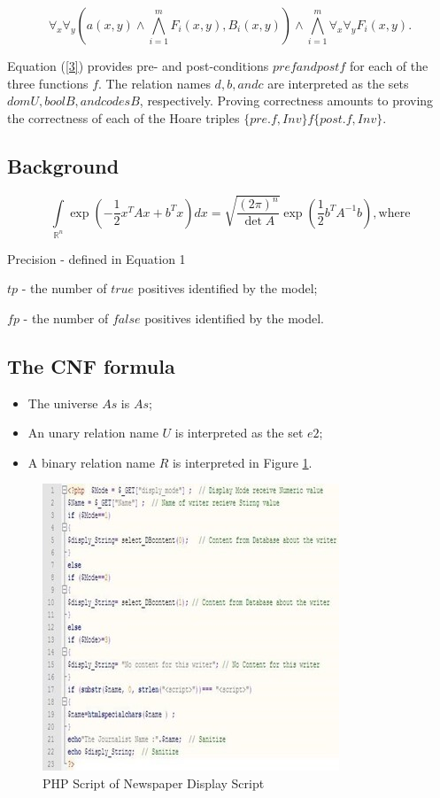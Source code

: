 \documentclass[12pt]{acmart}
\begin{document}
\begin{equation}
    \forall_x \forall_y (a(x,y) \wedge \bigwedge_{i=1}^mF_i(x,y), B_i(x,y)) \wedge \bigwedge_{i=1}^m \forall_x \forall_y F_i(x,y).
    \label{2}
\end{equation}
 
 Equation (\ref{3}) provides pre- and post-conditions $pref and postf$ for each of the three functions $f$. The relation names $d, b, and c$ are interpreted as the sets $domU   , boolB, and codesB$, respectively. Proving correctness amounts to proving the correctness of each of the Hoare triples $\{pre.f, Inv\}  f  \{post.f, Inv\}$.

\subsection{Background}

\begin{equation}
    \int\limits_{\mathbb{R}^n} \exp\left( -\frac{1}{2} x^T A x + b^T x \right) dx = \sqrt{\frac{(2\pi)^n}{\det A}} \exp\left( \frac{1}{2} b^T A^{-1} b \right),
    \text{where}
    \label{3}
\end{equation}

Precision - defined in Equation 1\par
    $tp$ - the number of $true$ positives identified by the model;\par
	$fp$ - the number of $false$ positives identified by the model.

\subsection{The CNF formula}

\begin{itemize}
    \item The universe $As$ is $As$;
    \item An unary relation name $U$ is interpreted as the set $e2$;
    \item A binary relation name $R$ is interpreted in Figure \ref{pic2}.
\end{itemize}

\begin{figure}[H]
    \centering
    \includegraphics{Picture2.jpg}
    \caption{PHP Script of Newspaper Display Script}
    \label{pic2}
\end{figure}
\end{document}
